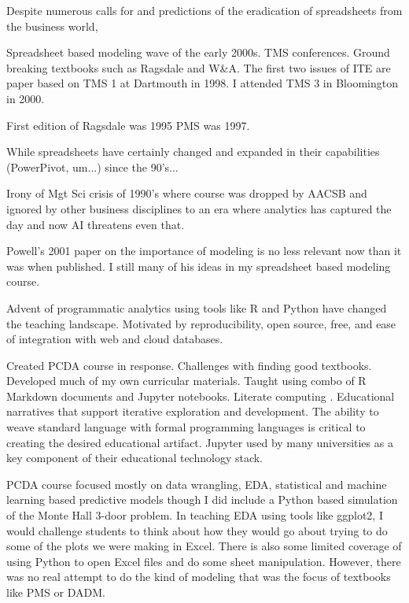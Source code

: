 \documentclass[ited,blindrev]{informs3}              %
\begin{document}
Despite numerous calls for and predictions of the eradication of spreadsheets from the business world, 


Spreadsheet based modeling wave of the early 2000s. TMS conferences. Ground breaking textbooks such as Ragsdale and W\&A.
The first two issues of ITE are paper based on TMS 1 at Dartmouth in 1998. I attended TMS 3 in Bloomington in 2000.

First edition of Ragsdale was 1995 PMS was 1997.

While spreadsheets have certainly changed and expanded in their capabilities (PowerPivot, um...) since the 90's...

Irony of Mgt Sci crisis of 1990's where course was dropped by AACSB and ignored by other business disciplines to an era where analytics has captured the day and now AI threatens even that.

Powell's 2001 paper on the importance of modeling is no less relevant now than it was when published. I still many of his ideas in my spreadsheet based modeling course.

Advent of programmatic analytics using tools like R and Python have changed the teaching landscape. Motivated by reproducibility, open source, free, and ease of integration with web and cloud databases.

Created PCDA course in response. Challenges with finding good textbooks. Developed much of my own curricular materials. Taught using combo of R Markdown documents and Jupyter notebooks. Literate computing \cite{Jupyter_proposal}. Educational narratives that support iterative exploration and development. The ability to weave standard language with formal programming languages is critical to creating the desired educational artifact. Jupyter used by many universities as a key component of their educational technology stack.


PCDA course focused mostly on data wrangling, EDA, statistical and machine learning based predictive models though I did include a Python based simulation of the Monte Hall 3-door problem. In teaching EDA using tools like ggplot2, I would challenge students to think about how they would go about trying to do some of the plots we were making in Excel. There is also some limited coverage of using Python to open Excel files and do some sheet manipulation. However, there was no real attempt to do the kind of modeling that was the focus of textbooks like PMS or DADM.
\end{document}
